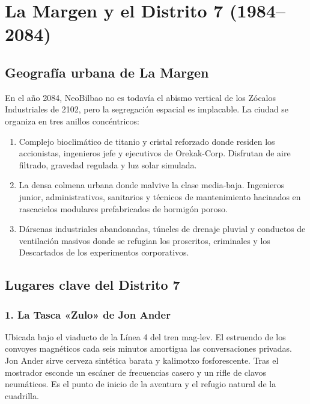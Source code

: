 \chapter{La Margen y el Distrito 7 (1984--2084)}

\section{Geografía urbana de La Margen}

En el año 2084, NeoBilbao no es todavía el abismo vertical de los Zócalos Industriales de 2102, pero la segregación espacial es implacable. La ciudad se organiza en tres anillos concéntricos:

\begin{enumerate}
  \item {} Complejo bioclimático de titanio y cristal reforzado donde residen los accionistas, ingenieros jefe y ejecutivos de Orekak-Corp. Disfrutan de aire filtrado, gravedad regulada y luz solar simulada.
  \item {} La densa colmena urbana donde malvive la clase media-baja. Ingenieros junior, administrativos, sanitarios y técnicos de mantenimiento hacinados en rascacielos modulares prefabricados de hormigón poroso.
  \item {} Dársenas industriales abandonadas, túneles de drenaje pluvial y conductos de ventilación masivos donde se refugian los proscritos, criminales y los Descartados de los experimentos corporativos.
\end{enumerate}

\section{Lugares clave del Distrito 7}

\subsection{1. La Tasca «Zulo» de Jon Ander}
Ubicada bajo el viaducto de la Línea 4 del tren mag-lev. El estruendo de los convoyes magnéticos cada seis minutos amortigua las conversaciones privadas. Jon Ander sirve cerveza sintética barata y kalimotxo fosforescente. Tras el mostrador esconde un escáner de frecuencias casero y un rifle de clavos neumáticos. Es el punto de inicio de la aventura y el refugio natural de la cuadrilla.

